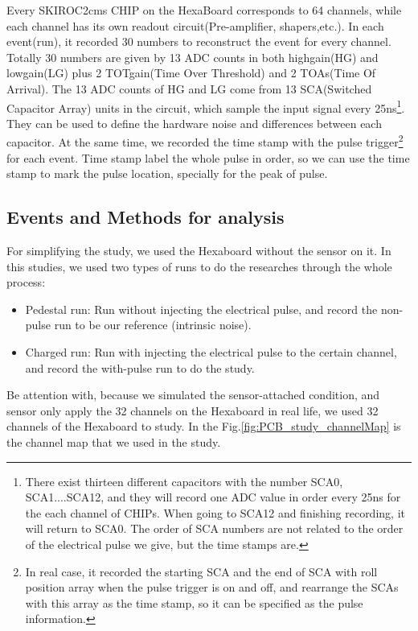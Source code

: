 Every SKIROC2cms CHIP on the HexaBoard corresponds to 64 channels, while each channel has its own readout circuit(Pre-amplifier, shapers,etc.). In each event(run), it recorded 30 numbers to reconstruct the event for every channel. Totally 30 numbers are given by 13 ADC counts in both highgain(HG) and lowgain(LG) plus 2 TOTgain(Time Over Threshold) and 2 TOAs(Time Of Arrival).  The 13 ADC counts of HG and LG come from 13 SCA(Switched Capacitor Array) units in the circuit, which sample the input signal every 25ns\footnote{There exist thirteen different capacitors with the number SCA0, SCA1....SCA12, and they will record one ADC value in order every 25ns for the each channel of CHIPs. When going to SCA12 and finishing recording, it will return to SCA0. The order of SCA numbers are not related to the order of the electrical pulse we give, but the time stamps are.}. They can be used to define the hardware noise and differences between each capacitor. At the same time, we recorded the time stamp with the pulse trigger\footnote{In real case, it recorded the starting SCA and the end of SCA with roll position array when the pulse trigger is on and off, and rearrange the SCAs with this array as the time stamp, so it can be specified as the pulse information.} for each event. Time stamp label the whole pulse in order,  so we can use the time stamp to mark the pulse location, specially for the peak of pulse. 

\subsection{Events and Methods for analysis}

For simplifying the study, we used the Hexaboard without the sensor on it. In this studies, we used two types of runs to do the researches through the whole process:
\begin{itemize}
\item Pedestal run: Run without injecting the electrical pulse, and record the non-pulse run to be our reference (intrinsic noise).
\item Charged run: Run with injecting the electrical pulse to the certain channel, and record the with-pulse run to do the study. 
\end{itemize}

Be attention with, because we simulated the sensor-attached condition, and sensor only apply the 32 channels on the Hexaboard in real life, we used 32 channels of the Hexaboard to study. In the Fig.\ref{fig:PCB_study_channelMap} is the channel map that we used in the study.


